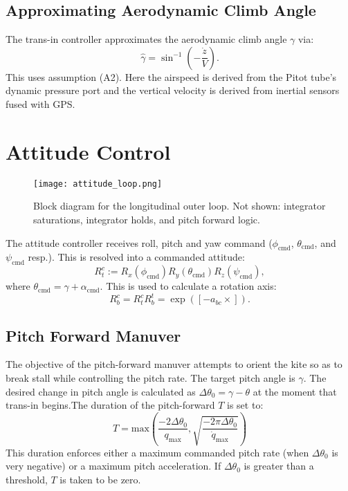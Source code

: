 \documentclass{article}
\newcommand{\alphacmd}{\alpha_\textrm{cmd}}
\newcommand{\phicmd}{\phi_\textrm{cmd}}
\newcommand{\thetacmd}{\theta_\textrm{cmd}}
\newcommand{\psicmd}{\psi_\textrm{cmd}}
\begin{document}
\subsection{Approximating Aerodynamic Climb Angle}
The trans-in controller approximates the aerodynamic climb angle $\gamma$ via:
\begin{equation}
\hat \gamma = \sin^{-1}\left(-\frac{\dot z}{V}\right).
\end{equation}
This uses assumption (A2).  Here the airspeed is derived from the
Pitot tube's dynamic pressure port and the vertical velocity is
derived from inertial sensors fused with GPS.


\section {Attitude Control}
\begin{figure}
\centering
\texttt{[image: attitude\_loop.png]}
\caption{Block diagram for the longitudinal outer loop.  Not shown:
  integrator saturations, integrator holds, and pitch forward logic.}
\end{figure}
The attitude controller receives roll, pitch and yaw command
($\phicmd$, $\thetacmd$, and $\psicmd$ resp.).  This is resolved into
a commanded attitude:
\begin{equation}
R_t^c := R_x(\phicmd) R_y(\thetacmd) R_z(\psicmd),
\end{equation}
where $\thetacmd = \gamma + \alphacmd.$ This is used to calculate
a rotation axis:
\begin{equation}
R^c_b = R_t^c R_b^t = \exp([-a_{bc} \times]).
\end{equation}
\subsection{Pitch Forward Manuver}
The objective of the pitch-forward manuver attempts to orient the kite
so as to break stall while controlling the pitch rate.  The target
pitch angle is $\gamma$.  The desired change in pitch
angle is calculated as $\Delta \theta_0 = \gamma - \theta$ at the
moment that trans-in begins.The duration of the pitch-forward $T$ is
set to:
\begin{equation}
T = \textrm{max}\left(
\frac{-2 \Delta\theta_0}{q_{\textrm{max}}},
\sqrt{\frac{-2 \pi \Delta\theta_0}{\dot q_{\textrm{max}}}}
 \right)
\end{equation}
This duration enforces either a maximum commanded pitch rate (when
$\Delta \theta_0$ is very negative) or a maximum pitch acceleration.
If $\Delta \theta_0$ is greater than a threshold, $T$ is taken to be zero.
\end{document}
